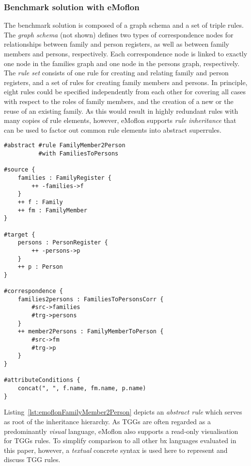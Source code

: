 \subsubsection{Benchmark solution with eMoflon}
\label{sec:solutionEMoflon}


The benchmark solution is composed of a graph schema and a set of triple rules.
The \emph{graph schema} (not shown) defines two types of correspondence nodes for relationships between family and person registers, as well as between family members and persons, respectively. Each correspondence node is linked to exactly one node in the families graph and one node in the persons graph, respectively.
%
The \emph{rule set} consists of one rule for creating and relating family and person registers, and a set of rules for creating family members and persons.
In principle, eight rules could be specified independently from each other for covering all cases with respect to the roles of family members, and the creation of a new or the reuse of an existing family.
As this would result in highly redundant rules with many copies of rule elements, however, eMoflon supports \emph{rule inheritance} that can be used to factor out common rule elements into abstract superrules. 

\begin{lstlisting}[label={lst:emoflonFamilyMember2Person}, float=bt!, language=emoflon, caption={Mapping family members to persons}]
#abstract #rule FamilyMember2Person 
          #with FamiliesToPersons

#source { 
    families : FamilyRegister {
        ++ -families->f
    }
    ++ f : Family
    ++ fm : FamilyMember
}

#target {
    persons : PersonRegister {
        ++ -persons->p
    }
    ++ p : Person
}

#correspondence {
    families2persons : FamiliesToPersonsCorr {
        #src->families
        #trg->persons
    }
    ++ member2Persons : FamilyMemberToPerson {
        #src->fm
        #trg->p
    }
}

#attributeConditions {
    concat(", ", f.name, fm.name, p.name)
}
\end{lstlisting}


Listing~\ref{lst:emoflonFamilyMember2Person} depicts an \emph{abstract rule} which serves as root of the inheritance hierarchy.
As TGGs are often regarded as a predominantly \emph{visual} language, eMoflon also supports a read-only visualisation for TGGs rules.  
To simplify comparison to all other bx languages evaluated in this paper, however, a \emph{textual} concrete syntax is used here to represent and discuss TGG rules.

